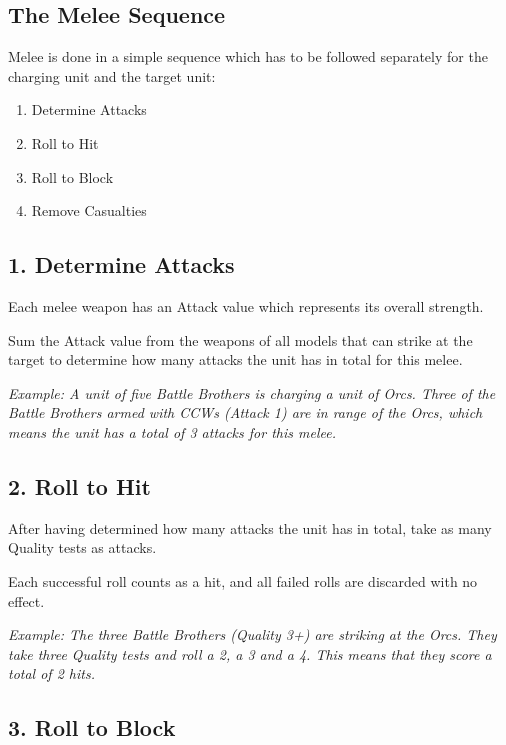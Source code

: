 \documentclass[9pt, a4paper]{extarticle}            %
\begin{document}
\begin{multicols}{2}
\subsection{The Melee Sequence}

Melee is done in a simple sequence which has to be followed separately for the charging unit and the target unit:

\begin{enumerate}
  \item Determine Attacks
  \item Roll to Hit
  \item Roll to Block
  \item Remove Casualties
\end{enumerate}

\subsection{1. Determine Attacks}

Each melee weapon has an Attack value which represents its overall strength.

Sum the Attack value from the weapons of all models that can strike at the target to determine how many attacks the unit has in total for this melee.

\textit{Example: A unit of five Battle Brothers is charging a unit of Orcs. Three of the Battle Brothers armed with CCWs (Attack 1) are in range of the Orcs, which means the unit has a total of 3 attacks for this melee.}

\subsection{2. Roll to Hit}

After having determined how many attacks the unit has in total, take as many Quality tests as attacks.

Each successful roll counts as a hit, and all failed rolls are discarded with no effect.

\textit{Example: The three Battle Brothers (Quality 3+) are striking at the Orcs. They take three Quality tests and roll a 2, a 3 and a 4. This means that they score a total of 2 hits.}

\subsection{3. Roll to Block}


\end{multicols}
\end{document}
